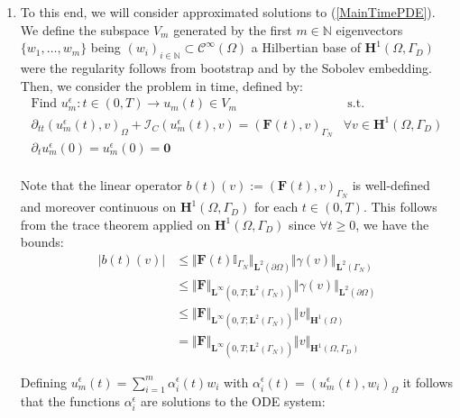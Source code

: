 \begin{enumerate}
    \item To this end, we will consider approximated solutions to (\ref{MainTimePDE}). We define the subspace $V_m$ generated by the first $m \in \mathbb{N}$ eigenvectors $\{w_1, \dots, w_m \}$ being $(w_i)_{i \in \mathbb{N}} \subset \mathcal{C}^{\infty}(\Omega)$ a Hilbertian base of $\mathbf{H}^1(\Omega, \Gamma_D)$ were the regularity follows from bootstrap and by the Sobolev embedding.
    Then, we consider the problem in time, defined by:
    \begin{equation}
        \label{ApproxTimePDE}
        \begin{array}{cc}
            \text{Find } u^{\epsilon}_m: t \in (0,T) \longrightarrow u_m(t) \in V_m & \text{ s.t. } \\
            \partial_{tt}(u_m^{\epsilon}(t),v)_{\Omega} + \mathcal{I}_{C}(u^{\epsilon}_m(t),v) = (\mathbf{F}(t),v)_{\Gamma_N} & \forall v \in \mathbf{H}^1(\Omega,\Gamma_D) \\
            \partial_{t} u^{\epsilon}_m(0) = u^{\epsilon}_m(0) = \mathbf{0} & \\
        \end{array}
    \end{equation}
    \begin{rem}
    Note that the linear operator $b(t)(v) := (\mathbf{F}(t),v)_{\Gamma_N}$ is well-defined and moreover continuous on $\mathbf{H}^1(\Omega,\Gamma_D)$ for each $t \in (0,T)$.
    This follows from the trace theorem applied on $\mathbf{H}^1(\Omega, \Gamma_D)$ since $\forall t \geq 0$, we have the bounds:
    \begin{align*}
        \vert b(t)(v) \vert & \leq \Vert \mathbf{F}(t) \mathbb{I}_{\Gamma_N} \Vert_{\mathbf{L}^2(\partial \Omega)} \Vert \gamma (v) \Vert_{\mathbf{L}^2(\Gamma_N)} \\
        & \leq \Vert \mathbf{F}\Vert_{\mathbf{L}^{\infty}(0,T;\mathbf{L}^2(\Gamma_N))} \Vert \gamma(v) \Vert_{\mathbf{L}^2(\partial \Omega)} \\
        & \leq \Vert \mathbf{F} \Vert_{\mathbf{L}^{\infty}(0,T;\mathbf{L}^2(\Gamma_N))} \Vert v \Vert_{\mathbf{H}^1(\Omega)}\\
        & = \Vert \mathbf{F}\Vert_{\mathbf{L}^{\infty}(0,T;\mathbf{L}^2(\Gamma_N))} \Vert v \Vert_{\mathbf{H}^1(\Omega, \Gamma_D)}
    \end{align*}
    \end{rem}
    Defining $u^{\epsilon}_m(t) = \sum_{i=1}^m \alpha_i^{\epsilon}(t) w_i$ with $\alpha_i^{\epsilon} (t) = (u^{\epsilon}_m(t),w_i)_{\Omega}$ it follows that the functions $\alpha_i^{\epsilon}$ are solutions to the ODE system:

\end{enumerate}

